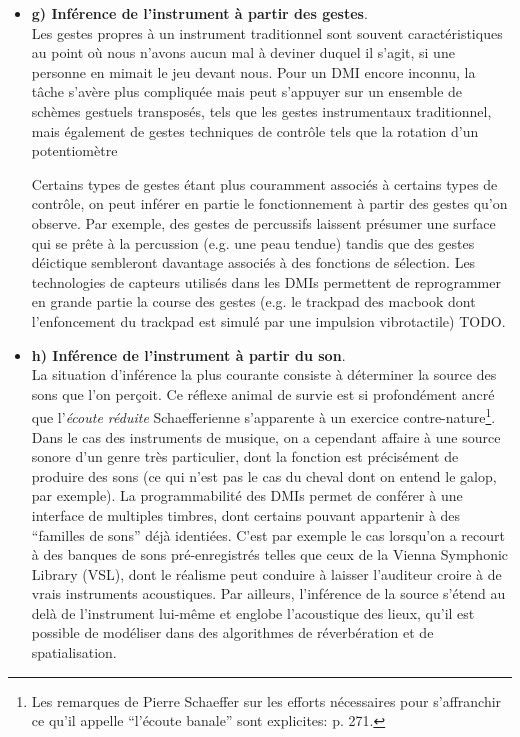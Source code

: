 \begin{itemize}[noitemsep]
	\item \textbf{g) Inférence de l'instrument à partir des gestes}.\\
	Les gestes propres à un instrument traditionnel sont souvent caractéristiques au point où nous n'avons aucun mal à deviner duquel il s'agit, si une personne en mimait le jeu devant nous. Pour un \gls{DMI} encore inconnu, la tâche s'avère plus compliquée mais peut s'appuyer sur un ensemble de schèmes gestuels transposés, tels que les gestes instrumentaux traditionnel, mais également de gestes techniques de contrôle tels que la rotation d'un potentiomètre

	Certains types de gestes étant plus couramment associés à certains types de contrôle, on peut inférer en partie le fonctionnement à partir des gestes qu'on observe. Par exemple, des gestes de percussifs laissent présumer une surface qui se prête à la percussion (e.g. une peau tendue) tandis que des gestes déictique sembleront davantage associés à des fonctions de sélection. Les technologies de capteurs utilisés dans les \glspl{DMI} permettent de reprogrammer en grande partie la course des gestes (e.g. le trackpad des macbook dont l'enfoncement du trackpad est simulé par une impulsion vibrotactile) TODO.

	\item \textbf{h) Inférence de l'instrument à partir du son}.\\
	La situation d'inférence la plus courante consiste à déterminer la source des sons que l'on perçoit. Ce réflexe animal de survie est si profondément ancré que l'\textit{écoute réduite} Schaefferienne s'apparente à un exercice contre-nature\footnote{Les remarques de Pierre Schaeffer sur les efforts nécessaires pour s'affranchir ce qu'il appelle ``l'écoute banale'' sont explicites:  \cite{schaeffer_traite_1966} p. 271.}. Dans le cas des instruments de musique, on a cependant affaire à une source sonore d'un genre très particulier, dont la fonction est précisément de produire des sons (ce qui n'est pas le cas du cheval dont on entend le galop, par exemple). La programmabilité des \glspl{DMI} permet de conférer à une interface de multiples timbres, dont certains pouvant appartenir à des ``familles de sons'' déjà identiées. C'est par exemple le cas lorsqu'on a recourt à des banques de sons pré-enregistrés telles que ceux de la Vienna Symphonic Library (VSL), dont le réalisme peut conduire à laisser l'auditeur croire à de vrais instruments acoustiques. Par ailleurs, l'inférence de la source s'étend au delà de l'instrument lui-même et englobe l'acoustique des lieux, qu'il est possible de modéliser dans des algorithmes de réverbération et de spatialisation.


\end{itemize}
